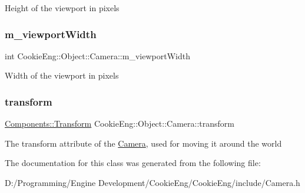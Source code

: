Height of the viewport in pixels \mbox{\label{class_cookie_eng_1_1_object_1_1_camera_a257e21bd91592e599162cd6bf0d618d6}} 
\subsubsection{\texorpdfstring{m\+\_\+viewport\+Width}{m\_viewportWidth}}
{\footnotesize\ttfamily int Cookie\+Eng\+::\+Object\+::\+Camera\+::m\+\_\+viewport\+Width\hspace{0.3cm}{\ttfamily [protected]}}

Width of the viewport in pixels \mbox{\label{class_cookie_eng_1_1_object_1_1_camera_aa996e685c79a71bd30e88341b68ed197}} 
\subsubsection{\texorpdfstring{transform}{transform}}
{\footnotesize\ttfamily \hyperlink{class_cookie_eng_1_1_components_1_1_transform}{Components\+::\+Transform} Cookie\+Eng\+::\+Object\+::\+Camera\+::transform}

The transform attribute of the \hyperlink{class_cookie_eng_1_1_object_1_1_camera}{Camera}, used for moving it around the world 

The documentation for this class was generated from the following file\+:\begin{DoxyCompactItemize}
\item 
D\+:/\+Programming/\+Engine Development/\+Cookie\+Eng/\+Cookie\+Eng/include/Camera.\+h\end{DoxyCompactItemize}
